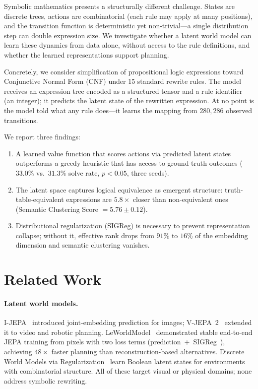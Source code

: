 \documentclass{article}
\begin{document}
Symbolic mathematics presents a structurally different challenge. States are
discrete trees, actions are combinatorial (each rule may apply at many
positions), and the transition function is deterministic yet
non-trivial---a single distribution step can double expression size. We
investigate whether a latent world model can learn these dynamics from
data alone, without access to the rule definitions, and whether the learned
representations support planning.

Concretely, we consider simplification of propositional logic expressions
toward Conjunctive Normal Form (CNF) under 15 standard rewrite rules.  The
model receives an expression tree encoded as a structured tensor and a rule
identifier (an integer); it predicts the latent state of the rewritten
expression. At no point is the model told what any rule does---it learns
the mapping from $280{,}286$ observed transitions.

We report three findings:
\begin{enumerate}
\item A learned value function that scores actions via predicted latent
states outperforms a greedy heuristic that has access to ground-truth
outcomes ($33.0\%$ vs.\ $31.3\%$ solve rate, $p{<}0.05$, three seeds).
\item The latent space captures logical equivalence as emergent structure:
truth-table-equivalent expressions are $5.8\times$ closer than
non-equivalent ones (Semantic Clustering Score $= 5.76 \pm 0.12$).
\item Distributional regularization (SIGReg) is necessary to prevent
representation collapse; without it, effective rank drops from $91\%$
to $16\%$ of the embedding dimension and semantic clustering vanishes.
\end{enumerate}

\section{Related Work}

\paragraph{Latent world models.}
I-JEPA~\cite{assran2023ijepa} introduced joint-embedding prediction for
images; V-JEPA~2~\cite{assran2025vjepa2} extended it to video and robotic
planning. LeWorldModel~\cite{maes2026lewm} demonstrated stable end-to-end
JEPA training from pixels with two loss terms
(prediction~$+$~SIGReg~\cite{balestriero2025lejepa}), achieving
$48\times$ faster planning than reconstruction-based alternatives. Discrete
World Models via Regularization~\cite{dwmr2026} learn Boolean latent states
for environments with combinatorial structure. All of these target visual or
physical domains; none address symbolic rewriting.
\end{document}
